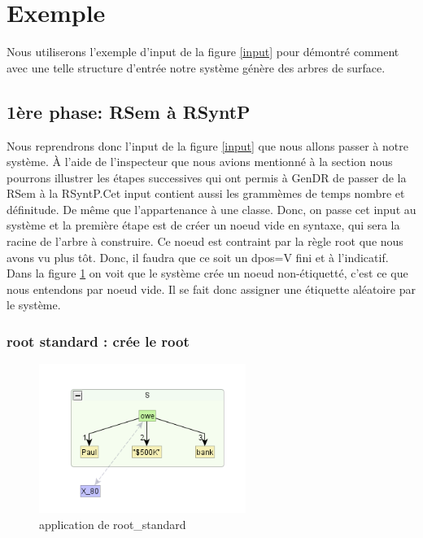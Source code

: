 \section{Exemple}\label{secexemple}

Nous utiliserons l'exemple d'input de la figure \ref{input} pour démontré comment avec une telle structure d'entrée notre système génère des arbres de surface.

\subsection{1ère phase: RSem à RSyntP}
Nous reprendrons donc l'input de la figure \ref{input} que nous allons passer à notre système. À l'aide de l'inspecteur que nous avions mentionné à la section  nous pourrons illustrer les étapes successives qui ont permis à GenDR de passer de la RSem à la RSyntP.Cet input contient aussi les grammèmes de temps nombre et définitude. De même que l'appartenance à une classe. Donc, on passe cet input au système et la première étape est de créer un noeud vide en syntaxe, qui sera la racine de l'arbre à construire. Ce noeud est contraint par la règle root que nous avons vu plus tôt. Donc, il faudra que ce soit un dpos=V fini et à l'indicatif. Dans la figure \ref{fig:rootstand} on voit que le système crée un noeud non-étiquetté, c'est ce que nous entendons par noeud vide. Il se fait donc assigner une étiquette aléatoire par le système.

\subsubsection{root standard : crée le root}
\begin{figure}[htb]
	\centering
	\includegraphics[width=0.6\textwidth, trim = {0cm 0cm 0cm 0cm},clip]{ch3/figs/inspecteur_root.png}
	\vspace{-0.5cm}
	\caption{application de root\_standard}
	\label{fig:rootstand}
\end{figure}

